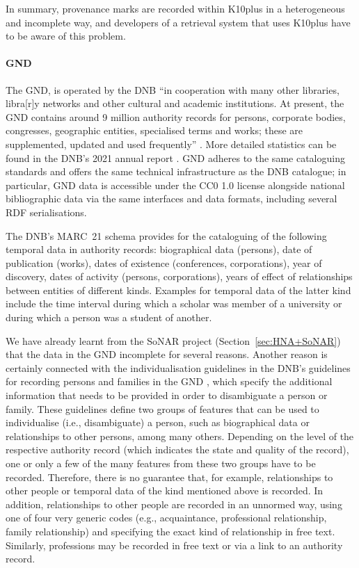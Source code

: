 In summary, provenance marks are recorded within K10plus in a heterogeneous
and incomplete way, and developers of a retrieval system that uses K10plus have to
be aware of this problem.

\paragraph{GND}

%
The \gls{GND}, is operated by the \gls{DNB}
\enquote{in cooperation with many other libraries, libra[r]y networks and other cultural and academic institutions.
At present, the GND contains around 9 million authority records for persons, corporate bodies, congresses, geographic entities, specialised terms and works; these are supplemented, updated and used frequently} \autocite{DNB_cataloguing}. More detailed statistics can be found in the DNB's
2021 annual report \autocite[p.49]{DNB_Jahresbericht_2021}.
GND adheres to the same cataloguing standards and offers the same technical infrastructure
as the DNB catalogue; in particular, GND data is accessible under the CC0 1.0 license alongside national bibliographic data
via the same interfaces and data formats, including several RDF serialisations.

The DNB's MARC~21 schema \autocite{DNB_MARC21}
provides for the cataloguing of the following temporal data in authority records:
biographical data (persons), date of publication (works), dates of existence (conferences, corporations),
year of discovery, dates of activity (persons, corporations), years of effect of relationships
between entities of different kinds. Examples for temporal data of the latter kind include
the time interval during which a scholar was member of a university or during which a person was a student of another.

We have already learnt from the \gls{SoNAR} project (Section~\ref{sec:HNA+SoNAR}) 
that the data in the GND incomplete for several reasons.
Another reason is certainly connected with the individualisation guidelines
in the DNB's guidelines for recording persons and families in the GND
\autocite[part EH-P-16]{GND_Erfassungshilfen}, which specify the additional information
that needs to be provided in order to disambiguate a person or family.
These guidelines define two groups of features that can be used to individualise
(i.e., disambiguate) a person, such as biographical data or relationships to other persons, among many others.
Depending on the level of the respective authority record
(which indicates the state and quality of the record), one or only a few of the many features
from these two groups have to be recorded.
Therefore, there is no guarantee that, for example, relationships to other people
or temporal data of the kind mentioned above is recorded.
In addition, relationships to other people are recorded in an unnormed way,
using one of four very generic codes (e.g., acquaintance, professional relationship, family relationship)
and specifying the exact kind of relationship in free text.
Similarly, professions may be recorded in free text or via a link to an authority record.


